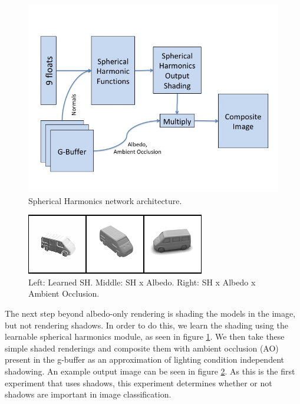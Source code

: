 \documentclass[10pt,twocolumn,letterpaper]{article}
\begin{document}
\begin{figure}[h!]
\centering
\includegraphics[width=1.0\columnwidth]{./assets/SH_model.jpg}
\caption{Spherical Harmonics network architecture.}
\label{fig:SHN}
\end{figure}

\begin{figure}[h!]
\centering
\includegraphics[width=1.0\columnwidth]{./assets/sh-comp-onerow.png}
\caption{Left: Learned SH. Middle: SH x Albedo. Right: SH x Albedo x Ambient Occlusion.}
\label{fig:SHComparison}
\end{figure}
The next step beyond albedo-only rendering is shading the models in the image, but not rendering shadows. In order to do this, we learn the shading using the learnable spherical harmonics module, as seen in figure \ref{fig:SHN}.  We then take these simple shaded renderings and composite them with ambient occlusion (AO) present in the g-buffer as an approximation of lighting condition independent shadowing. An example output image can be seen in figure \ref{fig:SHComparison}. As this is the first experiment that uses shadows, this experiment determines whether or not shadows are important in image classification.
\end{document}
